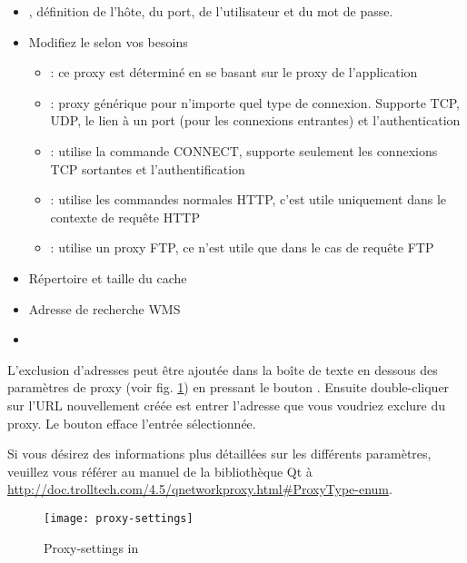 {\setlength{\baselineskip}{1.4\baselineskip}
\begin{itemize}[label=--]
\item {}, définition de l'hôte, du port, de l'utilisateur et du mot de passe.
\item Modifiez le  selon vos besoins
 \begin{itemize}[label=--,itemsep=2pt]
  \item {}: ce proxy est déterminé en se basant sur le proxy de l'application
  \item {}: proxy générique pour n'importe quel type de connexion. Supporte TCP, UDP, le lien à un port (pour les connexions entrantes) et l'authentication
  \item {}: utilise la commande CONNECT, supporte seulement les connexions TCP sortantes et l'authentification
  \item {}: utilise les commandes normales HTTP, c'est utile uniquement dans le contexte de requête HTTP
  \item {}: utilise un proxy FTP, ce n'est utile que dans le cas de requête FTP
\end{itemize}
\item Répertoire et taille du cache
\item Adresse de recherche WMS
\item {}
\end{itemize}}

L'exclusion d'adresses peut être ajoutée dans la boîte de texte en dessous des paramètres de proxy (voir fig. \ref{fig:proxy-settings}) en pressant le bouton . Ensuite double-cliquer sur l'URL nouvellement créée est entrer l'adresse que vous voudriez exclure du proxy. Le bouton  efface l'entrée sélectionnée.

Si vous désirez des informations plus détaillées sur les différents paramètres, veuillez vous référer au manuel de la bibliothèque Qt à \url{http://doc.trolltech.com/4.5/qnetworkproxy.html#ProxyType-enum}.

\begin{figure}[ht]
   \begin{center}
   \texttt{[image: proxy-settings]}
   \caption{Proxy-settings in \qg \nixcaption}
   \label{fig:proxy-settings}
\end{center} 
\end{figure}

